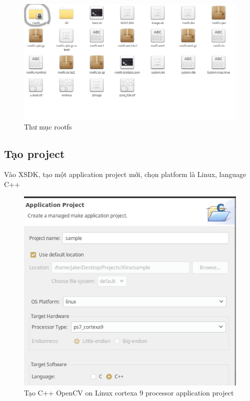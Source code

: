 \documentclass[a4paper]{report}
\begin{document}
\begin{figure}[H]
\centering
\includegraphics[width=.7\textwidth]{../images/fig/sdk1.png}
\caption{Thư mục rootfs}
\label{fig:sdk1}%
\end{figure}

\subsection*{Tạo project}
Vào XSDK, tạo một application project mới, chọn platform là Linux, language C++

\begin{figure}[H]
\centering
\includegraphics[width=.7\textwidth]{../images/fig/sdk2.png}
\caption{Tạo C++ OpenCV on Linux cortexa 9 processor application project}
\label{fig:sdk2}
\end{figure}
\end{document}
